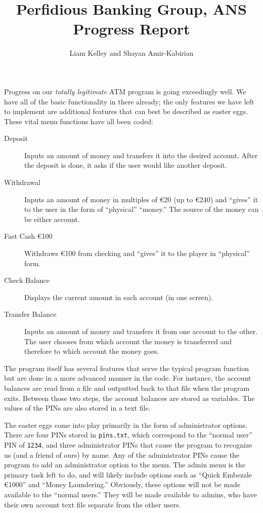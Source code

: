 \documentclass[12pt]{article}
\begin{document}
\title{Perfidious Banking Group, ANS\\Progress Report}
\author{Liam Kelley and Shayan Amir-Kabirian}
\maketitle

Progress on our \emph{totally legitimate} ATM program is going exceedingly well. We have all of the basic functionality in there already; the only features we have left to implement are additional features that can best be described as easter eggs. These vital menu functions have all been coded:
\begin{description}
	\item[Deposit] Inputs an amount of money and transfers it into the desired account. After the deposit is done, it asks if the user would like another deposit.
	\item[Withdrawal] Inputs an amount of money in multiples of €20 (up to €240) and ``gives'' it to the user in the form of ``physical'' ``money.'' The source of the money can be either account.
	\item[Fast Cash €100] Withdraws €100 from checking and ``gives'' it to the player in ``physical'' form.
	\item[Check Balance] Displays the current amount in each account (in one screen).
	\item[Transfer Balance] Inputs an amount of money and transfers it from one account to the other. The user chooses from which account the money is transferred and therefore to which account the money goes.
\end{description}
The program itself has several features that serve the typical program function but are done in a more advanced manner in the code. For instance, the account balances are read from a file and outputted back to that file when the program exits. Between those two steps, the account balances are stored as variables. The values of the PINs are also stored in a text file.

The easter eggs come into play primarily in the form of administrator options. There are four PINs stored in \texttt{pins.txt}, which correspond to  the ``normal user'' PIN of \texttt{1234}, and three administrator PINs that cause the program to recognize us (and a friend of ours) by name. Any of the administrator PINs cause the program to add an administrator option to the menu. The admin menu is the primary task left to do, and will likely include options such as ``Quick Embezzle €1000'' and ``Money Laundering.'' Obviously, these options will not be made available to the ``normal users.'' They will be made available to admins, who have their own account text file separate from the other users.
\end{document}
